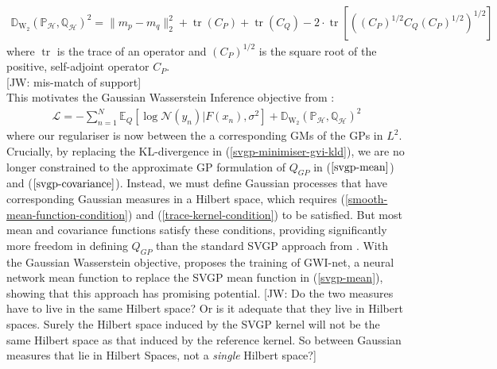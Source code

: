 \documentclass{article}
\newcommand{\jw}[1]{{\color{gray} [JW: #1]}}
\newcommand{\KLD}{\operatorname{\mathbb{D}_{KL}}}
\newcommand{\WD}{\operatorname{\mathbb{D}_{W_2}}}
\newcommand{\tr}{\operatorname{tr}}
\numberwithin{equation}{section}
\begin{document}
\begin{align}
    \label{wasserstein-distance}
    \WD \left(\mathbb{P}_{\mathcal{H}}, \mathbb{Q}_{\mathcal{H}}\right)^2 = \| m_p - m_q\|_2^2 + \tr(C_P) + \tr(C_Q) - 2 \cdot \tr \left[ \left( \left(C_P\right)^{1/2} C_Q \left(C_P\right)^{1/2}\right)^{1/2}\right]
\end{align}
where $\tr$ is the trace of an operator and $\left(C_P\right)^{1/2}$ is the square root of the positive, self-adjoint operator $C_P$.
\\\jw{mis-match of support}
\\This motivates the Gaussian Wasserstein Inference objective from \cite{wild2022generalized}:
\begin{align}
    \label{gwi-objective}
    \mathcal{L} = -\sum_{n=1}^N \mathbb{E}_{Q}\left[\log \mathcal{N}(y_n) \vert F(x_n), \sigma^2\right] + \WD \left(\mathbb{P}_{\mathcal{H}}, \mathbb{Q}_{\mathcal{H}}\right)^2
\end{align}
where our regulariser is now between the a corresponding GMs of the GPs in $L^2$.
Crucially, by replacing the KL-divergence in (\ref{svgp-minimiser-gvi-kld}), we are no longer constrained to the approximate GP formulation of $Q_{GP}$ in  ($\ref{svgp-mean}$) and ($\ref{svgp-covariance}$). Instead, we must define Gaussian processes that have corresponding Gaussian measures in a Hilbert space, which requires (\ref{smooth-mean-function-condition}) and (\ref{trace-kernel-condition}) to be satisfied. But most mean and covariance functions satisfy these conditions, providing significantly more freedom in defining $Q_{GP}$ than the standard SVGP approach from \cite{titsias2009variational}. With the Gaussian Wasserstein objective, \cite{wild2022generalized} proposes the training of GWI-net, a neural network mean function to replace the SVGP mean function in (\ref{svgp-mean}), showing that this approach has promising potential.
\jw{Do the two measures have to live in the same Hilbert space? Or is it adequate that they live in Hilbert spaces. Surely the Hilbert space induced by the SVGP kernel will not be the same Hilbert space as that induced by the reference kernel. So between Gaussian measures that lie in Hilbert Spaces, not a \textit{single} Hilbert space?}
\end{document}
